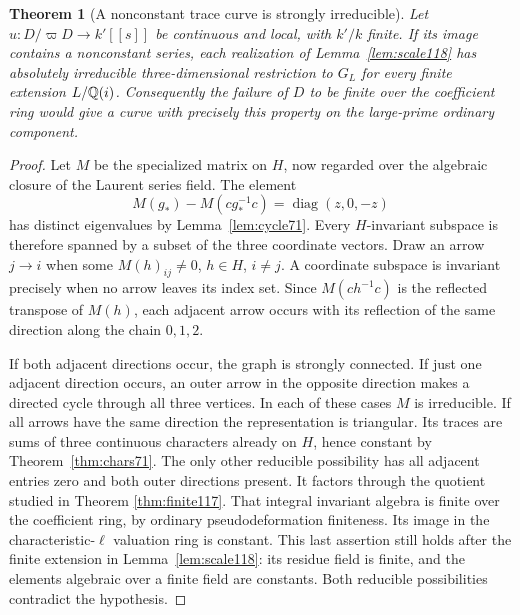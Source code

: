 \documentclass[a4paper,11pt]{article}
\newtheorem{theorem}[proposition]{Theorem}
\theoremstyle{definition}
\theoremstyle{remark}
\numberwithin{equation}{section}
\begin{document}
\begin{theorem}[A nonconstant trace curve is strongly irreducible]
\leavevmode\label{thm:strong118}
Let \(u:D/\varpi D\to k'[[s]]\) be continuous and local,
with \(k'/k\) finite. If its image contains a nonconstant
series, each realization of Lemma~\ref{lem:scale118} has
absolutely irreducible three-dimensional restriction to
\(G_L\) for every finite extension \(L/\mathbb Q(i)\).
Consequently the failure of \(D\) to be finite over the
coefficient ring would give a curve with precisely this
property on the large-prime ordinary component.
\end{theorem}
\begin{proof}
Let \(M\) be the specialized matrix on \(H\), now regarded over
the algebraic closure of the Laurent series field. The element
\[
 M(g_*)-M(cg_*^{-1}c)=\operatorname{diag}(z,0,-z)
\]
has distinct eigenvalues by Lemma~\ref{lem:cycle71}. Every
\(H\)-invariant subspace is therefore spanned by a subset of
the three coordinate vectors. Draw an arrow \(j\to i\) when
some \(M(h)_{ij}\ne0\), \(h\in H\), \(i\ne j\). A coordinate
subspace is invariant precisely when no arrow leaves its index
set. Since \(M(ch^{-1}c)\) is the reflected transpose of
\(M(h)\), each adjacent arrow occurs with its reflection of
the same direction along the chain \(0,1,2\).

If both adjacent directions occur, the graph is strongly
connected. If just one adjacent direction occurs, an outer arrow
in the opposite direction makes a directed cycle through all
three vertices. In each of these cases \(M\) is irreducible.
If all arrows have the same direction the representation is
triangular. Its traces are sums of three continuous characters
already on \(H\), hence constant by Theorem~\ref{thm:chars71}.
The only other reducible possibility has all adjacent entries
zero and both outer directions present. It factors through the
quotient studied in
Theorem \ref{thm:finite117}.
That integral invariant algebra is finite over the coefficient
ring, by ordinary pseudodeformation finiteness. Its image in
the characteristic-\(\ell\) valuation ring is constant.
This last assertion still holds after the finite extension
in Lemma~\ref{lem:scale118}: its residue field is finite, and
the elements algebraic over a finite field are constants.
Both reducible possibilities contradict the hypothesis.


\end{proof}
\end{document}
